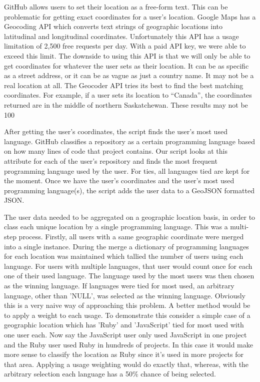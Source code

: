 \documentclass[11pt]{article}
\begin{document}
GitHub allows users to set their location as a free-form text. This can be problematic for getting exact coordinates for a user's location. Google Maps has a Geocoding API which converts text strings of geographic locations into latitudinal and longitudinal coordinates. Unfortunately this API has a usage limitation of 2,500 free requests per day. With a paid API key, we were able to exceed this limit. The downside to using this API is that we will only be able to get coordinates for whatever the user sets as their location. It can be as specific as a street address, or it can be as vague as just a country name. It may not be a real location at all. The Geocoder API tries its best to find the best matching coordinates. For example, if a user sets its location to “Canada”, the coordinates returned are in the middle of northern Saskatchewan. These results may not be 100%

After getting the user’s coordinates, the script finds the user’s most used language. GitHub classifies a repository as a certain programming language based on how many lines of code that project contains. Our script looks at this attribute for each of the user’s repository and finds the most frequent programming language used by the user. For ties, all languages tied are kept for the moment. Once we have the user’s coordinates and the user’s most used programming language(s), the script adds the user data to a GeoJSON formatted JSON.

The user data needed to be aggregated on a geographic location basis, in order to class each unique location by a single programming language. This was a multi-step process. Firstly, all users with a same geographic coordinate were merged into a single instance. During the merge a dictionary of programming languages for each location was maintained which tallied the number of users using each language. For users with multiple languages, that user would count once for each one of their used language. The language used by the most users was then chosen as the winning language. If languages were tied for most used, an arbitrary language, other than 'NULL', was selected as the winning language. Obviously this is a very naive way of approaching this problem. A better method would be to apply a weight to each usage. To demonstrate this consider a simple case of a geographic location which has 'Ruby' and 'JavaScript' tied for most used with one user each. Now say the JavaScript user only used JavaScript in one project and the Ruby user used Ruby in hundreds of projects. In this case it would make more sense to classify the location as Ruby since it's used in more projects for that area. Applying a usage weighting would do exactly that, whereas, with the arbitrary selection each language has a 50\% chance of being selected.
\end{document}
